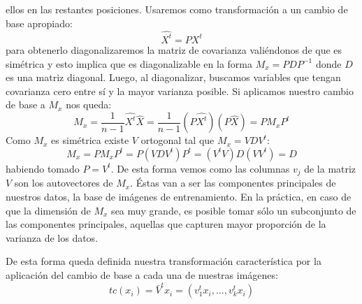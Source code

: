 ellos en las restantes posiciones. Usaremos como transformación a un cambio de base apropiado:
\begin{displaymath}
 \hat{X^t} = PX^t
\end{displaymath}
para obtenerlo diagonalizaremos la matriz de covarianza valiéndonos de que es simétrica y esto implica que es diagonalizable en la forma 
$M_x = PDP^{-1}$ donde $D$ es una matriz diagonal.  Luego, al diagonalizar, buscamos variables que tengan covarianza cero entre sí y la 
mayor varianza posible. Si aplicamos nuestro cambio de base a $M_x$ nos queda:
\begin{displaymath}
 M_x = \frac{1}{n-1}\hat{X^t}\hat{X} = \frac{1}{n-1}(P\hat{X^t})(P\hat{X}) = PM_xP^t
\end{displaymath}
Como $M_x$ es simétrica existe $V$ ortogonal tal que $M_x = VD{V^t}$:
\begin{displaymath}
 M_x = PM_xP^t = P(VD{V^t})P^t = ({V^t}V)D(V{V^t}) = D
\end{displaymath}
habiendo tomado $P = V^t$. De esta forma vemos como las columnas $v_j$ de la matriz $V$ son los autovectores de $M_x$. Éstas van a ser
las componentes principales de nuestros datos, la base de imágenes de entrenamiento. En la práctica, en caso de que la dimensión 
de $M_x$ sea muy grande, es posible tomar sólo un subconjunto de las componentes principales, aquellas que capturen mayor proporción
de la varianza de los datos.
\par
De esta forma queda definida nuestra transformación característica por la aplicación del cambio de base a cada una de nuestras imágenes:
\begin{displaymath}
 tc(x_i) = \bar{V}^{t}x_i = (v_1^{t}x_i,...,v_k^{t}x_i)
\end{displaymath}



